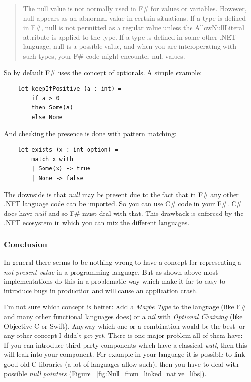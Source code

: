 \documentclass[11pt, a4paper]{report}
\begin{document}
\begin{quotation}
    The null value is not normally used in F\# for values or variables. However, null appears as an abnormal value in certain situations. If a type is defined in F\#, null is not permitted as a regular value unless the AllowNullLiteral attribute is applied to the type. If a type is defined in some other .NET language, null is a possible value, and when you are interoperating with such types, your F\# code might encounter null values.\cite{null-in-fsharp}
\end{quotation}

\noindent So by default F\# uses the concept of optionals\cite{optional-in-fsharp}. A simple example:

\begin{lstlisting}
    let keepIfPositive (a : int) = 
        if a > 0 
        then Some(a) 
        else None
\end{lstlisting}

\noindent And checking the presence is done with pattern matching:

\begin{lstlisting}
    let exists (x : int option) =
        match x with
        | Some(x) -> true
        | None -> false
\end{lstlisting}

\noindent The downside is that \textit{null} may be present due to the fact that in F\# any other .NET language code can be imported. So you can use C\# code in your F\#. C\# does have \textit{null} and so F\# must deal with that. This drawback is enforced by the .NET ecosystem in which you can mix the different languages.

\subsubsection{Conclusion}

In general there seems to be nothing wrong to have a concept for representing a \textit{not present value} in a programming language. But as shown above most implementations do this in a problematic way which make it far to easy to introduce bugs in production and will cause an application crash.

I'm not sure which concept is better: Add a \textit{Maybe Type} to the language (like F\# and many other functional languages does) or a \textit{nil} with \textit{Optional Chaining} (like Objective-C or Swift). Anyway which one or a combination would be the best, or any other concept I didn't get yet. There is one major problem all of them have: If you can introduce third party components which have a classical \textit{null}, then this will leak into your component. For example in your language it is possible to link good old C libraries (a lot of languages allow such), then you have to deal with possible \textit{null pointers} (Figure ~\ref{fig:Null_from_linked_native_libs}). 
\end{document}
